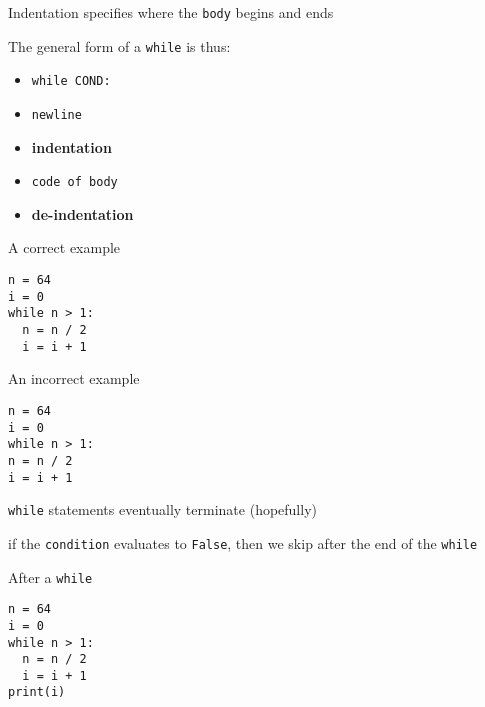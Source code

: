 \documentclass{beamer}
\begin{document}
\begin{slide}{
\item Indentation specifies where the \texttt{body} begins and ends
\item The general form of a \texttt{while} is thus:
\begin{itemize}
\item \texttt{while COND:}
\item \texttt{newline}
\item \textbf{indentation}
\item \texttt{code of body}
\item \textbf{de-indentation}
\end{itemize}
}\end{slide}

\begin{frame}[fragile]{A correct example}
\begin{lstlisting}[frame=shadowbox]
n = 64
i = 0
while n > 1:
  n = n / 2
  i = i + 1
\end{lstlisting}
\end{frame}

\begin{frame}[fragile]{An incorrect example}
\begin{lstlisting}[frame=shadowbox]
n = 64
i = 0
while n > 1:
n = n / 2
i = i + 1
\end{lstlisting}
\end{frame}

\begin{slide}{
\item \texttt{while} statements eventually terminate (hopefully)
\item if the \texttt{condition} evaluates to \texttt{False}, then we skip after the end of the \texttt{while}
}\end{slide}

\begin{frame}[fragile]{After a \texttt{while}}
\begin{lstlisting}[frame=shadowbox]
n = 64
i = 0
while n > 1:
  n = n / 2
  i = i + 1
print(i)
\end{lstlisting}
\end{frame}
\end{document}
